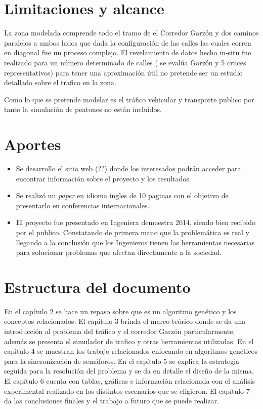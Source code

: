 \section{Limitaciones y alcance}

La zona modelada comprende todo el tramo de el Corredor Garzón y dos caminos paralelos a ambos lados que dada la configuración de las calles las cuales corren en diagonal fue un proceso complejo.
El revelamiento de datos hecho in-situ fue realizado para un número determinado de calles ( se evalúa Garzón y 5 cruces representativos) para tener una aproximación útil no pretende ser un estudio detallado sobre el trafico en la zona.

Como lo que se pretende modelar es el tráfico vehicular y transporte publico por tanto la simulación de peatones no están incluidos.


\section{Aportes}

\begin{itemize}
	\item Se desarrollo el sitio web (??) donde los interesados podrán acceder para encontrar información sobre el proyecto y los resultados.
	\item Se realizó un \emph{paper} en idioma ingles de 10 paginas con el objetivo de presentarlo en conferencias internacionales.
	\item El proyecto fue presentado en Ingeniera demuestra 2014, siendo bien recibido por el publico. Constatando de primera mano que la problemática es real y llegando a la conclusión que los Ingenieros tienen las herramientas necesarias para solucionar problemas que afectan directamente a la sociedad.

\end{itemize}






\section{Estructura del documento}
En el capítulo 2 se hace un repaso sobre que es un algoritmo genético y los conceptos relacionados.
El capitulo 3 brinda el marco teórico donde se da una introducción al problema del tráfico y el corredor Garzón particularmente, además se presenta el simulador de trafico y otras herramientas utilizadas.
En el capitulo 4 se muestran los trabajo relacionados enfocando en algoritmos genéticos para la sincronización de semáforos.
En el capítulo 5 se explica la estrategia seguida para la resolución del problema y se da en detalle el diseño de la misma.
El capítulo 6 cuenta con tablas, gráficas e información relacionada con el análisis experimental realizado en los distintos escenarios que se eligieron.
El capítulo 7 da las conclusiones finales y el trabajo a futuro que se puede realizar.






